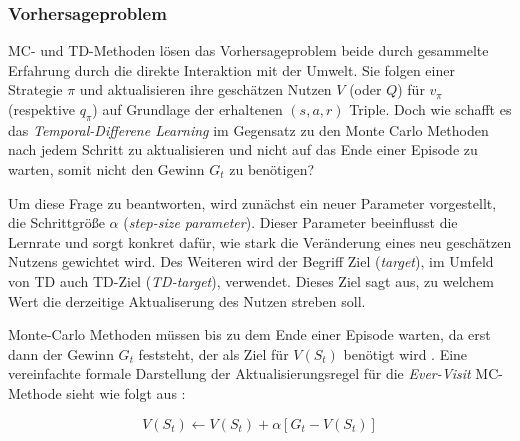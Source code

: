 \subsubsection{Vorhersageproblem}
MC- und TD-Methoden lösen das Vorhersageproblem beide durch gesammelte Erfahrung durch die direkte Interaktion mit der Umwelt. Sie folgen einer Strategie $\pi$ und aktualisieren ihre geschätzen Nutzen $V$ (oder $Q$) für $v_\pi$ (respektive $q_\pi$) auf Grundlage der erhaltenen $(s,a,r)$ Triple. Doch wie schafft es das \textit{Temporal-Differene Learning} im Gegensatz zu den Monte Carlo Methoden nach jedem Schritt zu aktualisieren und nicht auf das Ende einer Episode zu warten, somit nicht den Gewinn $G_t$ zu benötigen?
\par 
Um diese Frage zu beantworten, wird zunächst ein neuer Parameter vorgestellt, die Schrittgröße $\alpha$ (\textit{step-size parameter}). Dieser Parameter beeinflusst die Lernrate und sorgt konkret dafür, wie stark die Veränderung eines neu geschätzen Nutzens gewichtet wird. Des Weiteren wird der Begriff \glqq Ziel\grqq{} (\textit{target}), im Umfeld von TD auch TD-Ziel (\textit{TD-target}), verwendet. Dieses Ziel sagt aus, zu welchem Wert die derzeitige Aktualiserung des Nutzen streben soll.
\par 
Monte-Carlo Methoden müssen bis zu dem Ende einer Episode warten, da erst dann der Gewinn $G_t$ feststeht, der als Ziel für $V(S_t)$ benötigt wird \cite[S.~119]{Sutton1998}. Eine vereinfachte formale Darstellung der Aktualisierungsregel für die \textit{Ever-Visit} MC-Methode sieht wie folgt aus \cite[S.~119]{Sutton1998}:

\begin{equation}
    V(S_t) \gets V(S_t) + \alpha \left[G_t - V(S_t)\right]
\end{equation}

